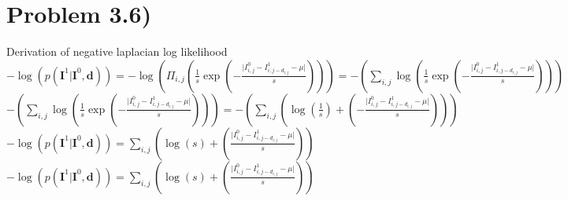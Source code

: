 \documentclass[11pt]{article} %
\begin{document}
 	\section*{Problem 3.6)}
  	Derivation of negative laplacian log likelihood\\
 	$- \log \left( p(\textbf{I}^1 \vert \textbf{I}^0, \textbf{d})\right) = - \log \left( \Pi_{i,j} \left( \frac{1}{s} \exp \left( -\frac{ \lvert I^0 _{i,j} - I^1 _{i,j - d_{i,j}} - \mu \lvert}{s} \right) \right)\right) = - \left( \sum_{i,j} \log \left( \frac{1}{s} \exp \left( -\frac{ \lvert I^0 _{i,j} - I^1 _{i,j - d_{i,j}} - \mu \lvert}{s} \right) \right)\right) $\\
	 $- \left( \sum_{i,j} \log \left( \frac{1}{s} \exp \left( -\frac{ \lvert I^0 _{i,j} - I^1 _{i,j - d_{i,j}} - \mu \lvert}{s} \right) \right)\right) = - \left( \sum_{i,j} \left( \log \left( \frac{1}{s}\right) + \left( -\frac{ \lvert I^0 _{i,j} - I^1 _{i,j - d_{i,j}} - \mu \lvert}{s} \right) \right)\right) $\\
	 $- \log \left( p(\textbf{I}^1 \vert \textbf{I}^0, \textbf{d})\right) = \sum_{i,j} \left( \log \left( s \right) + \left( \frac{ \lvert I^0 _{i,j} - I^1 _{i,j - d_{i,j}} - \mu \lvert}{s} \right) \right) $\\
	 $- \log \left( p(\textbf{I}^1 \vert \textbf{I}^0, \textbf{d})\right) = \sum_{i,j} \left( \log \left( s \right) + \left( \frac{ \lvert I^0 _{i,j} - I^1 _{i,j - d_{i,j}} - \mu \lvert}{s} \right) \right) $\\
\end{document}
